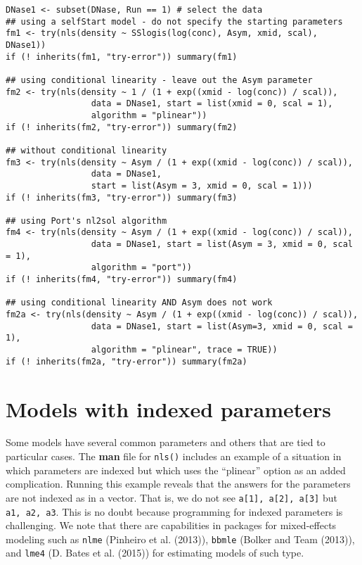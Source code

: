 \begin{verbatim}
DNase1 <- subset(DNase, Run == 1) # select the data
## using a selfStart model - do not specify the starting parameters
fm1 <- try(nls(density ~ SSlogis(log(conc), Asym, xmid, scal), DNase1))
if (! inherits(fm1, "try-error")) summary(fm1)

## using conditional linearity - leave out the Asym parameter
fm2 <- try(nls(density ~ 1 / (1 + exp((xmid - log(conc)) / scal)),
                 data = DNase1, start = list(xmid = 0, scal = 1),
                 algorithm = "plinear"))
if (! inherits(fm2, "try-error")) summary(fm2)

## without conditional linearity
fm3 <- try(nls(density ~ Asym / (1 + exp((xmid - log(conc)) / scal)),
                 data = DNase1,
                 start = list(Asym = 3, xmid = 0, scal = 1)))
if (! inherits(fm3, "try-error")) summary(fm3)

## using Port's nl2sol algorithm
fm4 <- try(nls(density ~ Asym / (1 + exp((xmid - log(conc)) / scal)),
                 data = DNase1, start = list(Asym = 3, xmid = 0, scal = 1),
                 algorithm = "port"))
if (! inherits(fm4, "try-error")) summary(fm4)

## using conditional linearity AND Asym does not work
fm2a <- try(nls(density ~ Asym / (1 + exp((xmid - log(conc)) / scal)), 
                 data = DNase1, start = list(Asym=3, xmid = 0, scal = 1),
                 algorithm = "plinear", trace = TRUE))
if (! inherits(fm2a, "try-error")) summary(fm2a)
\end{verbatim}

\hypertarget{models-with-indexed-parameters}{%
\section{Models with indexed parameters}\label{models-with-indexed-parameters}}

Some models have several common parameters and
others that are tied to particular cases.
The \textbf{man} file for \texttt{nls()} includes an example of a situation in which
parameters are indexed but which uses the ``plinear'' option as an added complication.
Running this example reveals that the answers for the parameters are not indexed
as in a vector.
That is, we do not see \texttt{a{[}1{]},\ a{[}2{]},\ a{[}3{]}} but \texttt{a1,\ a2,\ a3}.
This is no doubt because programming for indexed parameters is challenging.
We note that there are capabilities in packages for mixed-effects modeling
such as \texttt{nlme} (Pinheiro et al. (2013)), \texttt{bbmle} (Bolker and Team (2013)), and \texttt{lme4} (D. Bates et al. (2015)) for
estimating models of such type.

